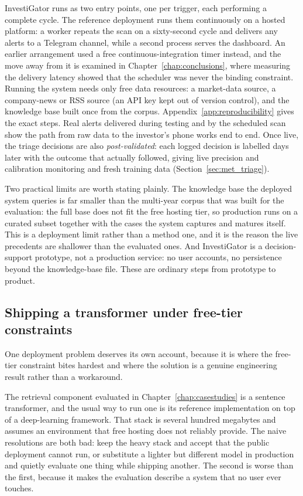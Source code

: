InvestiGator runs as two entry points, one per trigger, each performing a complete cycle. The reference
deployment runs them continuously on a hosted platform: a worker repeats the scan on a sixty-second
cycle and delivers any alerts to a Telegram channel, while a second process serves the dashboard. An
earlier arrangement used a free continuous-integration timer instead, and the move away from it is
examined in Chapter~\ref{chap:conclusions}, where measuring the delivery latency showed that the
scheduler was never the binding constraint. Running the system needs only free data resources: a
market-data source, a company-news or RSS source (an API key kept out of version control), and the
knowledge base built once from the corpus. Appendix~\ref{app:reproducibility} gives the exact steps. Real alerts
delivered during testing and by the scheduled scan show the path from raw data to the investor's phone
works end to end. Once live, the triage decisions are also \emph{post-validated}: each logged decision is
labelled days later with the outcome that actually followed, giving live precision and calibration
monitoring and fresh training data (Section~\ref{sec:met_triage}).

Two practical limits are worth stating plainly. The knowledge base the deployed system queries is far
smaller than the multi-year corpus that was built for the evaluation: the full base does not fit the
free hosting tier, so production runs on a curated subset together with the cases the system captures
and matures itself. This is a deployment limit rather than a method one, and it is the reason the
live precedents are shallower than the evaluated ones. And InvestiGator is a decision-support
prototype, not a production service: no user accounts, no persistence beyond the knowledge-base file. These are ordinary steps from prototype to product.

\subsection*{Shipping a transformer under free-tier constraints}

One deployment problem deserves its own account, because it is where the free-tier constraint bites
hardest and where the solution is a genuine engineering result rather than a workaround.

The retrieval component evaluated in Chapter~\ref{chap:casestudies} is a sentence transformer, and the
usual way to run one is its reference implementation on top of a deep-learning framework. That stack is
several hundred megabytes and assumes an environment that free hosting does not reliably provide. The
naive resolutions are both bad: keep the heavy stack and accept that the public deployment cannot run,
or substitute a lighter but different model in production and quietly evaluate one thing while shipping
another. The second is worse than the first, because it makes the evaluation describe a system that no
user ever touches.

